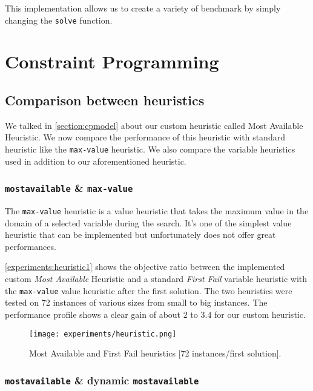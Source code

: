 \documentclass[../../thesis.tex]{subfiles}
\begin{document}
This implementation allows us to create a variety of benchmark by simply changing the \texttt{solve} function.


\section{Constraint Programming}

\subsection{Comparison between heuristics}

We talked in \autoref{section:cpmodel} about our custom heuristic called Most Available Heuristic.
We now compare the performance of this heuristic with standard heuristic like the \texttt{max-value} heuristic.
We also compare the variable heuristics used in addition to our aforementioned heuristic.

\subsubsection{\texttt{mostavailable} \& \texttt{max-value}}

The \texttt{max-value} heuristic is a value heuristic that takes the maximum value in the domain of a selected variable during the search.
It's one of the simplest value heuristic that can be implemented but unfortunately does not offer great performances.

\autoref{experiments:heuristic1} shows the objective ratio between the implemented custom \textit{Most Available} Heuristic and a standard 
\textit{First Fail} variable heuristic with the \texttt{max-value} value heuristic after the first solution.
The two heuristics were tested on 72 instances of various sizes from small to big instances.
The performance profile shows a clear gain of about $2$ to $3.4$ for our custom heuristic.


\begin{figure}
  \centering
  \texttt{[image: experiments/heuristic.png]}
  \caption{Most Available and First Fail heuristics [72 instances/first solution].}
  \label{experiments:heuristic1}
\end{figure}


\subsubsection{\texttt{mostavailable} \& dynamic \texttt{mostavailable}}
\end{document}
